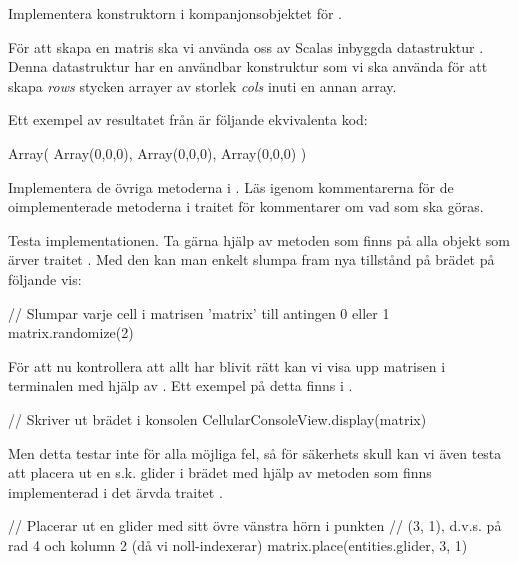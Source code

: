 \Subtask Implementera konstruktorn i kompanjonsobjektet för .

För att skapa en matris ska vi använda oss av Scalas inbyggda datastruktur . Denna datastruktur har en användbar konstruktur  som vi ska använda för att skapa \emph{rows} stycken arrayer av storlek \emph{cols} inuti en annan array.

Ett exempel av resultatet från  är följande ekvivalenta kod:

\begin{Code}
Array(
	Array(0,0,0),
	Array(0,0,0),
	Array(0,0,0)
)
\end{Code}



\Subtask Implementera de övriga metoderna i . Läs igenom kommentarerna för de oimplementerade metoderna i traitet  för kommentarer om vad som ska göras.


\Subtask Testa implementationen. Ta gärna hjälp av metoden  som finns på alla objekt som ärver traitet . Med den kan man enkelt slumpa fram nya tillstånd på brädet på följande vis:

\begin{Code}
// Slumpar varje cell i matrisen 'matrix' till antingen 0 eller 1
matrix.randomize(2)
\end{Code}

För att nu kontrollera att allt har blivit rätt kan vi visa upp matrisen i terminalen med hjälp av . Ett exempel på detta finns i .

\begin{Code}
// Skriver ut brädet i konsolen
CellularConsoleView.display(matrix)
\end{Code}

Men detta testar inte för alla möjliga fel, så för säkerhets skull kan vi även testa att placera ut en s.k. glider i brädet med hjälp av metoden  som finns implementerad i det ärvda traitet .

\begin{Code}
// Placerar ut en glider med sitt övre vänstra hörn i punkten
// (3, 1), d.v.s. på rad 4 och kolumn 2 (då vi noll-indexerar)
matrix.place(entities.glider, 3, 1)
\end{Code}

